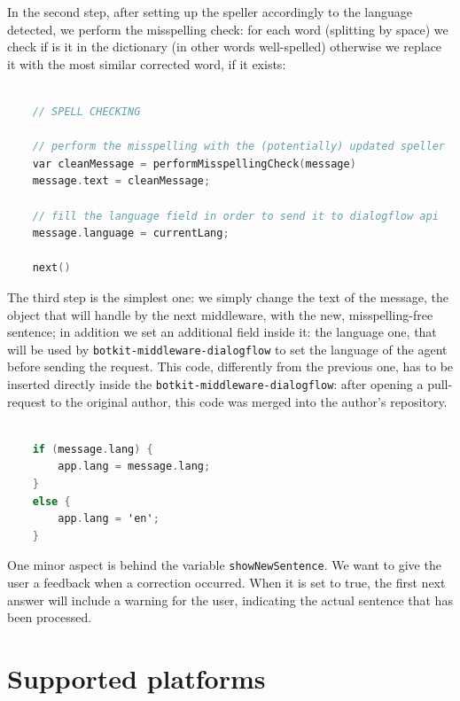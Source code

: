 \documentclass[a4paper,12pt]{report}
\begin{document}
	In the second step, after setting up the speller accordingly to the language detected, we perform the misspelling check: for each word (splitting by space) we check if is it in the dictionary (in other words well-spelled) otherwise we replace it with the most similar corrected word, if it exists:
	
	\begin{lstlisting}[language=C]
	
	// SPELL CHECKING
	
	// perform the misspelling with the (potentially) updated speller
	var cleanMessage = performMisspellingCheck(message)
	message.text = cleanMessage;
	
	// fill the language field in order to send it to dialogflow api
	message.language = currentLang;
	
	next()
	\end{lstlisting}
	
	The third step is the simplest one: we simply change the text of the message, the object that will handle by the next middleware, with the new, misspelling-free sentence; in addition we set an additional field inside it: the language one, that will be used by \texttt{botkit-middleware-dialogflow} to set the language of the agent before sending the request. This code, differently from the previous one, has to be inserted directly inside the \texttt{botkit-middleware-dialogflow}: after opening a pull-request to the original author, this code was merged into the author's repository.
	
	\begin{lstlisting}[language=C]
	
	if (message.lang) {
		app.lang = message.lang;
	}
	else {
		app.lang = 'en';
	}
	\end{lstlisting}
	
	One minor aspect is behind the variable \texttt{showNewSentence}. We want to give the user a feedback when a correction occurred. When it is set to true, the first next answer will include a warning for the user, indicating the actual sentence that has been processed.
	
	\section{Supported platforms}
	
\end{document}
